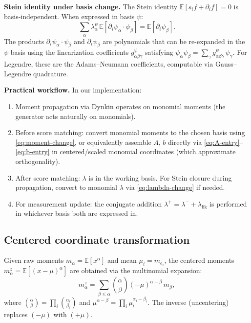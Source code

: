 \documentclass{article}
\newcommand{\E}{\mathbb{E}}
\theoremstyle{definition}
\begin{document}
\textbf{Stein identity under basis change.}
The Stein identity $\E[s_i f + \partial_i f] = 0$ is
basis-independent. When expressed in basis $\psi$:
\begin{equation}
    \sum_\alpha \lambda^\psi_\alpha\,
    \E[\partial_i \psi_\alpha \cdot \psi_\beta]
    = \E[\partial_i \psi_\beta].
\end{equation}
The products $\partial_i \psi_\alpha \cdot \psi_\beta$ and
$\partial_i \psi_\beta$ are polynomials that can be re-expanded
in the $\psi$ basis using the linearization coefficients
$g^\psi_{\alpha\beta\gamma}$ satisfying
$\psi_\alpha \psi_\beta = \sum_\gamma g^\psi_{\alpha\beta\gamma}\,
\psi_\gamma$.
For Legendre, these are the Adams--Neumann coefficients,
computable via Gauss--Legendre quadrature.

\textbf{Practical workflow.}
In our implementation:
\begin{enumerate}[leftmargin=2em]
    \item Moment propagation via Dynkin operates on monomial moments
    (the generator acts naturally on monomials).
    \item Before score matching: convert monomial moments to the
    chosen basis using \eqref{eq:moment-change},
    or equivalently assemble $A$, $b$ directly via
    \eqref{eq:A-entry}--\eqref{eq:b-entry} in centered/scaled
    monomial coordinates (which approximate orthogonality).
    \item After score matching: $\lambda$ is in the working basis.
    For Stein closure during propagation, convert to monomial
    $\lambda$ via \eqref{eq:lambda-change} if needed.
    \item For measurement update: the conjugate addition
    $\lambda^+ = \lambda^- + \lambda_{\mathrm{lik}}$ is performed
    in whichever basis both are expressed in.
\end{enumerate}

\subsection{Centered coordinate transformation}
\label{app:centering}

Given raw moments $m_\alpha = \E[x^\alpha]$ and mean
$\mu_i = m_{e_i}$, the centered moments
$m^z_\alpha = \E[(x - \mu)^\alpha]$ are obtained via
the multinomial expansion:
\begin{equation}
    m^z_\alpha = \sum_{\beta \le \alpha}
    \binom{\alpha}{\beta} (-\mu)^{\alpha-\beta}\, m_\beta,
    \label{eq:centering}
\end{equation}
where $\binom{\alpha}{\beta} = \prod_i \binom{\alpha_i}{\beta_i}$
and $\mu^{\alpha-\beta} = \prod_i \mu_i^{\alpha_i - \beta_i}$.
The inverse (uncentering) replaces $(-\mu)$ with $(+\mu)$.
\end{document}
